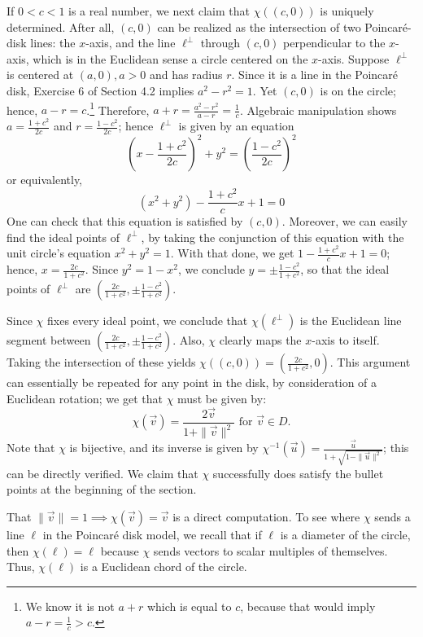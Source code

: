 \documentclass[leqno]{book}
\begin{document}
If $0<c<1$ is a real number, we next claim that $\chi((c,0))$ is uniquely determined.  After all, $(c,0)$ can be realized as the intersection of two Poincar\'e-disk lines: the $x$-axis, and the line $\ell^\perp$ through $(c,0)$ perpendicular to the $x$-axis, which is in the Euclidean sense a circle centered on the $x$-axis.  Suppose $\ell^\perp$ is centered at $(a,0),a>0$ and has radius $r$.  Since it is a line in the Poincar\'e disk, Exercise 6 of Section 4.2 implies $a^2-r^2=1$.  Yet $(c,0)$ is on the circle; hence, $a-r=c$.\footnote{We know it is not $a+r$ which is equal to $c$, because that would imply $a-r=\frac 1c>c$.}  Therefore, $a+r=\frac{a^2-r^2}{a-r}=\frac 1c$.  Algebraic manipulation shows $a=\frac{1+c^2}{2c}$ and $r=\frac{1-c^2}{2c}$; hence $\ell^\perp$ is given by an equation
$$\left(x-\frac{1+c^2}{2c}\right)^2+y^2=\left(\frac{1-c^2}{2c}\right)^2$$
or equivalently,
$$(x^2+y^2)-\frac{1+c^2}cx+1=0$$
One can check that this equation is satisfied by $(c,0)$.  Moreover, we can easily find the ideal points of $\ell^\perp$, by taking the conjunction of this equation with the unit circle's equation $x^2+y^2=1$.  With that done, we get $1-\frac{1+c^2}cx+1=0$; hence, $x=\frac{2c}{1+c^2}$.  Since $y^2=1-x^2$, we conclude $y=\pm\frac{1-c^2}{1+c^2}$, so that the ideal points of $\ell^\perp$ are $\left(\frac{2c}{1+c^2},\pm\frac{1-c^2}{1+c^2}\right)$.

Since $\chi$ fixes every ideal point, we conclude that $\chi(\ell^\perp)$ is the Euclidean line segment between $\left(\frac{2c}{1+c^2},\pm\frac{1-c^2}{1+c^2}\right)$.  Also, $\chi$ clearly maps the $x$-axis to itself.  Taking the intersection of these yields $\chi((c,0))=\left(\frac{2c}{1+c^2},0\right)$.  This argument can essentially be repeated for any point in the disk, by consideration of a Euclidean rotation; we get that $\chi$ must be given by:
$$\chi(\vec v)=\frac{2\vec v}{1+\|\vec v\|^2}\text{ for }\vec v\in D.$$
Note that $\chi$ is bijective, and its inverse is given by $\chi^{-1}(\vec u)=\frac{\vec u}{1+\sqrt{1-\|\vec u\|^2}}$; this can be directly verified.  We claim that $\chi$ successfully does satisfy the bullet points at the beginning of the section.

That $\|\vec v\|=1\implies\chi(\vec v)=\vec v$ is a direct computation.  To see where $\chi$ sends a line $\ell$ in the Poincar\'e disk model, we recall that if $\ell$ is a diameter of the circle, then $\chi(\ell)=\ell$ because $\chi$ sends vectors to scalar multiples of themselves.  Thus, $\chi(\ell)$ is a Euclidean chord of the circle.
\end{document}
